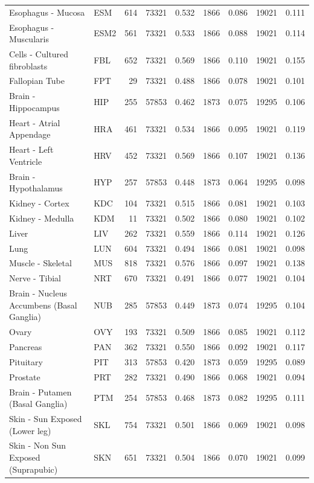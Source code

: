 \begin{tabular}{llrrlrlrl}
Esophagus - Mucosa & ESM & 614 & 73321 & 0.532 & 1866 & 0.086 & 19021 & 0.111 \\
Esophagus - Muscularis & ESM2 & 561 & 73321 & 0.533 & 1866 & 0.088 & 19021 & 0.114 \\
Cells - Cultured fibroblasts & FBL & 652 & 73321 & 0.569 & 1866 & 0.110 & 19021 & 0.155 \\
Fallopian Tube & FPT & 29 & 73321 & 0.488 & 1866 & 0.078 & 19021 & 0.101 \\
Brain - Hippocampus & HIP & 255 & 57853 & 0.462 & 1873 & 0.075 & 19295 & 0.106 \\
Heart - Atrial Appendage & HRA & 461 & 73321 & 0.534 & 1866 & 0.095 & 19021 & 0.119 \\
Heart - Left Ventricle & HRV & 452 & 73321 & 0.569 & 1866 & 0.107 & 19021 & 0.136 \\
Brain - Hypothalamus & HYP & 257 & 57853 & 0.448 & 1873 & 0.064 & 19295 & 0.098 \\
Kidney - Cortex & KDC & 104 & 73321 & 0.515 & 1866 & 0.081 & 19021 & 0.103 \\
Kidney - Medulla & KDM & 11 & 73321 & 0.502 & 1866 & 0.080 & 19021 & 0.102 \\
Liver & LIV & 262 & 73321 & 0.559 & 1866 & 0.114 & 19021 & 0.126 \\
Lung & LUN & 604 & 73321 & 0.494 & 1866 & 0.081 & 19021 & 0.098 \\
Muscle - Skeletal & MUS & 818 & 73321 & 0.576 & 1866 & 0.097 & 19021 & 0.138 \\
Nerve - Tibial & NRT & 670 & 73321 & 0.491 & 1866 & 0.077 & 19021 & 0.104 \\
Brain - Nucleus Accumbens (Basal Ganglia) & NUB & 285 & 57853 & 0.449 & 1873 & 0.074 & 19295 & 0.104 \\
Ovary & OVY & 193 & 73321 & 0.509 & 1866 & 0.085 & 19021 & 0.112 \\
Pancreas & PAN & 362 & 73321 & 0.550 & 1866 & 0.092 & 19021 & 0.117 \\
Pituitary & PIT & 313 & 57853 & 0.420 & 1873 & 0.059 & 19295 & 0.089 \\
Prostate & PRT & 282 & 73321 & 0.490 & 1866 & 0.068 & 19021 & 0.094 \\
Brain - Putamen (Basal Ganglia) & PTM & 254 & 57853 & 0.468 & 1873 & 0.082 & 19295 & 0.111 \\
Skin - Sun Exposed (Lower leg) & SKL & 754 & 73321 & 0.501 & 1866 & 0.069 & 19021 & 0.098 \\
Skin - Non Sun Exposed (Suprapubic) & SKN & 651 & 73321 & 0.504 & 1866 & 0.070 & 19021 & 0.099 \\

\end{tabular}
